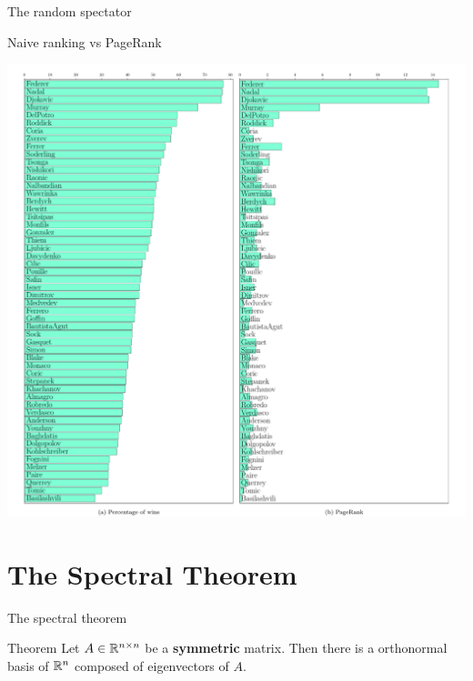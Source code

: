 \documentclass{beamer}
\begin{document}
\begin{frame}[t]{The random spectator}
	\grid

\end{frame}

\begin{frame}[t]{Naive ranking vs PageRank}
	\grid

	\vspace{-1.0cm}
	\begin{center}
		\hspace*{-1.3cm}
		\includegraphics[width=13.5cm]{../pagerank_tennis.pdf}
	\end{center}
\end{frame}

\section{The Spectral Theorem}

\begin{frame}[t]{The spectral theorem}
	\grid
	
	\vspace{-0.3cm}
	\begin{block}{Theorem}
	Let $A \in \mathbb{R}^{n \times n}$ be a \textbf{symmetric} matrix. Then there is a orthonormal basis of $\mathbb{R}^n$ composed of eigenvectors of $A$.
	\end{block}
\end{frame}
\end{document}
